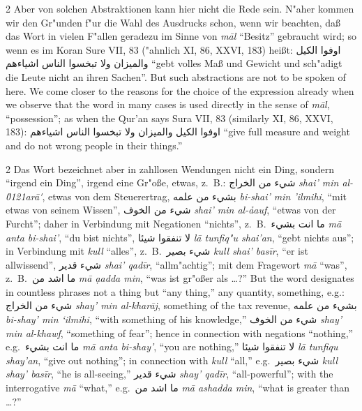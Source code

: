 \documentclass[10pt,a4paper]{article}
\renewcommand{\switchcolumn}{\syncronize\nointerlineskip\columnbreak}
\newcommand{\RL}[1]{\beginR#1\endR}
\newcommand{\ar}[1]{{\arabicfont\RL{#1}}}
\newcommand{\s}[1]{\d{#1}}
\newcommand{\enquote}[1]{``#1''}
\begin{document}
\begin{paracol}{2}
Aber von solchen Abstraktionen kann hier nicht die Rede sein. N"aher kommen wir den Gr"unden f"ur die Wahl des Ausdrucks schon, wenn wir beachten, da\ss{} das Wort in vielen F"allen geradezu im Sinne von \textit{m\=al} \enquote{Besitz} gebraucht wird; so wenn es im Koran Sure VII, 83 ("ahnlich XI, 86, XXVI, 183) hei\ss{}t: \ar{اوفوا الكيل والميزان ولا تبخسوا الناس اشياءهم} \enquote{gebt volles Ma\ss{} und Gewicht und sch"adigt die Leute nicht an ihren Sachen}.
\switchcolumn
But such abstractions are not to be spoken of here. We come closer to the reasons for the choice of the expression already when we observe that the word in many cases is used directly in the sense of \textit{m\=al}, ``possession''; as when the Qur'an says Sura VII, 83 (similarly XI, 86, XXVI, 183): \ar{اوفوا الكيل والميزان ولا تبخسوا الناس اشياءهم} ``give full measure and weight and do not wrong people in their things.''
\end{paracol}

\begin{paracol}{2}
Das Wort bezeichnet aber in zahllosen Wendungen nicht ein Ding, sondern \enquote{irgend ein Ding}, irgend eine Gr"o\ss{}e, etwas, z.\ B.: \ar{شيء من الخراج} \textit{shai' min al-\u0121ar\=a\g\'}, etwas von dem Steuerertrag, \ar{بشيء من علمه} \textit{bi-shai' min 'ilmihi}, \enquote{mit etwas von seinem Wissen}, \ar{شيء من الخوف} \textit{shai' min al-\h{a}auf}, \enquote{etwas von der Furcht}; daher in Verbindung mit Negationen \enquote{nichts}, z.\ B.\ \ar{ما انت بشيء} \textit{m\=a anta bi-shai'}, \enquote{du bist nichts}, \ar{لا تنفقوا شيئا} \textit{l\=a tunfiq"u shai'an}, \enquote{gebt nichts aus}; in Verbindung mit \textit{kull} \enquote{alles}, z.\ B.\ \ar{شيء بصير} \textit{kull shai' bas\={i}r}, \enquote{er ist allwissend}, \ar{شيء قدير} \textit{shai' qad\={i}r}, \enquote{allm"achtig}; mit dem Fragewort \textit{m\=a} \enquote{was}, z.\ B.\ \ar{ما اشد من} \textit{m\=a a\s{}adda min}, \enquote{was ist gr"o\ss{}er als \ldots{}?}
\switchcolumn
But the word designates in countless phrases not a thing but ``any thing,'' any quantity, something, e.g.: \ar{شيء من الخراج} \textit{shay' min al-khar\=aj}, something of the tax revenue, \ar{بشيء من علمه} \textit{bi-shay' min `ilmihi}, ``with something of his knowledge,'' \ar{شيء من الخوف} \textit{shay' min al-khawf}, ``something of fear''; hence in connection with negations ``nothing,'' e.g.\ \ar{ما انت بشيء} \textit{m\=a anta bi-shay'}, ``you are nothing,'' \ar{لا تنفقوا شيئا} \textit{l\=a tunfiqu shay'an}, ``give out nothing''; in connection with \textit{kull} ``all,'' e.g.\ \ar{شيء بصير} \textit{kull shay' bas\={i}r}, ``he is all-seeing,'' \ar{شيء قدير} \textit{shay' qad\={i}r}, ``all-powerful''; with the interrogative \textit{m\=a} ``what,'' e.g.\ \ar{ما اشد من} \textit{m\=a ashadda min}, ``what is greater than \ldots{}?''
\end{paracol}
\end{document}

